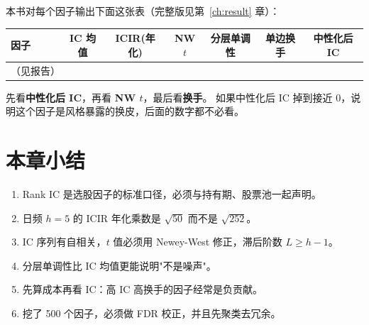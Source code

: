 本书对每个因子输出下面这张表（完整版见第~\ref{ch:result} 章）：

\begin{center}
\small
\begin{tabular}{@{}lcccccc@{}}
\toprule
因子 & IC 均值 & ICIR(年化) & NW $t$ & 分层单调性 & 单边换手 & 中性化后 IC \\
\midrule
（见报告） & & & & & & \\
\bottomrule
\end{tabular}
\end{center}

\begin{warnbox}[读表的顺序]
先看\textbf{中性化后 IC}，再看 \textbf{NW $t$}，最后看\textbf{换手}。
如果中性化后 IC 掉到接近 0，说明这个因子是风格暴露的换皮，后面的数字都不必看。
\end{warnbox}

\section{本章小结}

\begin{enumerate}
  \item Rank IC 是选股因子的标准口径，必须与持有期、股票池一起声明。
  \item 日频 $h=5$ 的 ICIR 年化乘数是 $\sqrt{50}$ 而不是 $\sqrt{252}$。
  \item IC 序列有自相关，$t$ 值必须用 Newey-West 修正，滞后阶数 $L\ge h-1$。
  \item 分层单调性比 IC 均值更能说明"不是噪声"。
  \item 先算成本再看 IC：高 IC 高换手的因子经常是负贡献。
  \item 挖了 500 个因子，必须做 FDR 校正，并且先聚类去冗余。
\end{enumerate}
